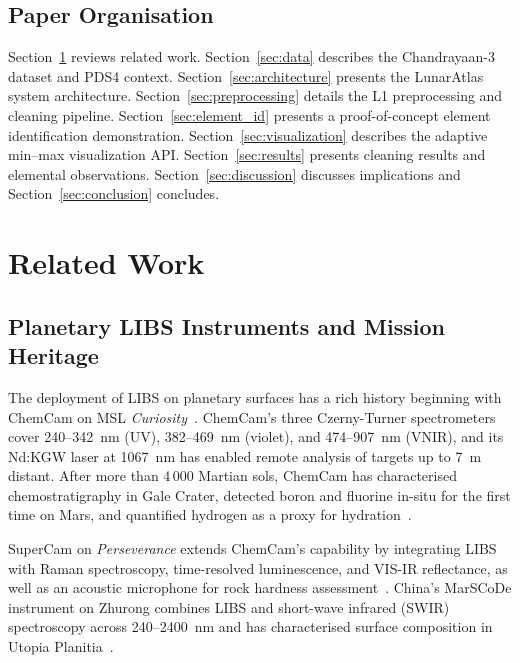 \documentclass[a4paper,twocolumn,10pt]{article}
\begin{document}
\subsection{Paper Organisation}

Section~\ref{sec:related} reviews related work.
Section~\ref{sec:data} describes the Chandrayaan-3 dataset and PDS4 context.
Section~\ref{sec:architecture} presents the LunarAtlas system architecture.
Section~\ref{sec:preprocessing} details the L1 preprocessing and cleaning pipeline.
Section~\ref{sec:element_id} presents a proof-of-concept element identification demonstration.
Section~\ref{sec:visualization} describes the adaptive min--max visualization API.
Section~\ref{sec:results} presents cleaning results and elemental observations.
Section~\ref{sec:discussion} discusses implications and Section~\ref{sec:conclusion} concludes.


\section{Related Work}
\label{sec:related}

\subsection{Planetary LIBS Instruments and Mission Heritage}

The deployment of LIBS on planetary surfaces has a rich history
beginning with ChemCam on MSL \emph{Curiosity}~\cite{Wiens2012,
Maurice2012}.  ChemCam's three Czerny-Turner spectrometers cover
240--342~nm (UV), 382--469~nm (violet), and 474--907~nm (VNIR), and
its Nd:KGW laser at 1067~nm has enabled remote analysis of targets up
to 7~m distant.  After more than 4\,000 Martian sols, ChemCam has
characterised chemostratigraphy in Gale Crater, detected boron and
fluorine in-situ for the first time on Mars, and quantified hydrogen as
a proxy for hydration~\cite{Gasda2017,Schroder2015}.

SuperCam on \emph{Perseverance} extends ChemCam's capability by
integrating LIBS with Raman spectroscopy, time-resolved luminescence,
and VIS-IR reflectance, as well as an acoustic microphone for rock
hardness assessment~\cite{Wiens2020,Maurice2022}.  China's MarSCoDe
instrument on Zhurong combines LIBS and short-wave infrared (SWIR)
spectroscopy across 240--2400~nm and has characterised surface
composition in Utopia Planitia~\cite{Xu2021,Zhao2023}.
\end{document}
